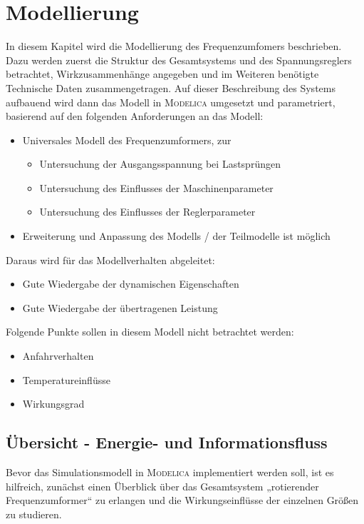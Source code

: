 \newcommand{\dsize}{width=\textwidth, height=6cm, keepaspectratio}

\chapter{Modellierung}
\label{chap:Modellierung}
In diesem Kapitel wird die Modellierung des Frequenzumfomers beschrieben. Dazu werden zuerst die Struktur des Gesamtsystems und des Spannungsreglers betrachtet, Wirkzusammenhänge angegeben und im Weiteren benötigte Technische Daten zusammengetragen. Auf dieser Beschreibung des Systems aufbauend wird dann das Modell in \textsc{Modelica} umgesetzt und parametriert, basierend auf den folgenden Anforderungen an das Modell:
\begin{itemize}
    \item Universales Modell des Frequenzumformers, zur \begin{itemize}
        \item Untersuchung der Ausgangsspannung bei Lastsprüngen
        \item Untersuchung des Einflusses der Maschinenparameter
        \item Untersuchung des Einflusses der Reglerparameter
    \end{itemize}
    \item Erweiterung und Anpassung des Modells / der Teilmodelle ist möglich
\end{itemize}
Daraus wird für das Modellverhalten abgeleitet: 
\begin{itemize}
    \item Gute Wiedergabe der dynamischen Eigenschaften
    \item Gute Wiedergabe der übertragenen Leistung
\end{itemize}
Folgende Punkte sollen in diesem Modell nicht betrachtet werden: 
\begin{itemize}
        \item Anfahrverhalten
        \item Temperatureinflüsse
        \item Wirkungsgrad
\end{itemize}

\section{Übersicht - Energie- und Informationsfluss}\label{sec:uxfcbersicht---energie--und-informationsfluss}

Bevor das Simulationsmodell in \textsc{Modelica} implementiert werden soll, ist es hilfreich, zunächst einen Überblick über das Gesamtsystem „rotierender Frequenzumformer“ zu erlangen und die Wirkungseinflüsse der einzelnen Größen zu studieren.

